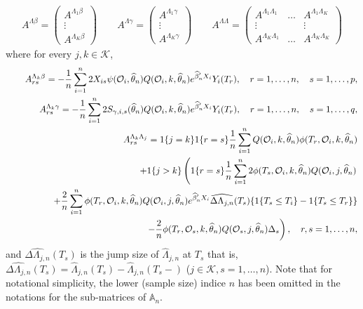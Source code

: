\documentclass{statsoc}
\begin{document}
\begin{eqnarray*}
A^{\Lambda\beta}=\left(
\begin{array}{c}
A^{\Lambda_1\beta}\\
\vdots\\
A^{\Lambda_K\beta}
\end{array}
\right)\quad\quad
A^{\Lambda\gamma}=\left(
\begin{array}{c}
A^{\Lambda_1\gamma}\\
\vdots\\
A^{\Lambda_K\gamma}
\end{array}
\right)\quad\quad
A^{\Lambda\Lambda}=\left(
\begin{array}{ccc}
A^{\Lambda_1\Lambda_1}& \ldots& A^{\Lambda_1\Lambda_K}\\
\vdots& &\vdots\\
A^{\Lambda_K\Lambda_1}& \ldots& A^{\Lambda_K\Lambda_K}
\end{array}
\right)
\end{eqnarray*}
where for every $j,k\in\mathcal K$,
\begin{eqnarray*}
&&A^{\Lambda_k\beta}_{rs}=-\frac{1}{n}\sum_{i=1}^n2X_{is}\psi(\mathcal O_i,\widehat\theta_n)Q(\mathcal O_i,k,\widehat\theta_n) e^{\widehat\beta_n'X_i} Y_i(T_r), \quad r=1,\ldots,n, \quad s=1,\ldots,p,\\
&&A^{\Lambda_k\gamma}_{rs}=-\frac{1}{n}\sum_{i=1}^n2S_{\gamma,i,s}(\widehat\theta_n)Q(\mathcal O_i,k,\widehat\theta_n) e^{\widehat\beta_n'X_i} Y_i(T_r), \quad r=1,\ldots,n, \quad s=1,\ldots,q,\\
&&A^{\Lambda_k\Lambda_j}_{rs}=1\{j=k\}1\{r=s\} \frac{1}{n}\sum_{i=1}^n Q(\mathcal O_i,k,\widehat\theta_n)\phi(T_r, \mathcal O_i,k,\widehat\theta_n)\\
&&\hspace{1.25cm}+1\{j>k\}\left(1\{r=s\}\frac{1}{n}\sum_{i=1}^n 2 \phi(T_s, \mathcal O_i,k,\widehat\theta_n)Q(\mathcal O_i,j, \widehat\theta_n)\right.\\
&&\hspace{1.5cm} +\frac{2}{n} \sum_{i=1}^n\phi(T_r, \mathcal O_i, k, \widehat\theta_n)Q(\mathcal O_i,j, \widehat\theta_n)e^{\widehat\beta_n'X_i} \widehat{\Delta \Lambda_{j,n}}(T_s) \{1\{T_s\leq T_i\}- 1\{T_s\leq T_r\}\}\\
&&\hspace{1.5cm} \left.-\frac{2}{n}\phi(T_r, \mathcal O_s,k,\widehat\theta_n) Q(\mathcal O_s,j, \widehat\theta_n)\Delta_s\right), \quad r,s=1,\ldots,n,
\end{eqnarray*}
and $\widehat{\Delta \Lambda_{j,n}}(T_s)$ is the jump size of $\widehat\Lambda_{j,n}$ at $T_s$ that is, $\widehat{\Delta \Lambda_{j,n}}(T_s)=\widehat\Lambda_{j,n}(T_s)-\widehat\Lambda_{j,n}(T_s-)$ ($j\in\mathcal K, s=1,\ldots,n$). Note that for notational simplicity, the lower (sample size) indice $n$ has been omitted in the notations for the sub-matrices of $\mathbb A_n$.
\end{document}
